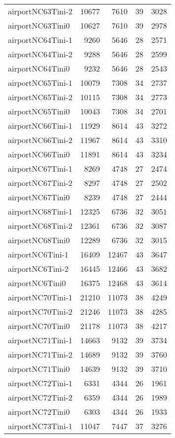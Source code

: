 \begin{longtable}{lrrrr}
airportNC63Tini-2 & 10677 & 7610 & 39 & 3028 \\
airportNC63Tini0 & 10627 & 7610 & 39 & 2978 \\
airportNC64Tini-1 & 9260 & 5646 & 28 & 2571 \\
airportNC64Tini-2 & 9288 & 5646 & 28 & 2599 \\
airportNC64Tini0 & 9232 & 5646 & 28 & 2543 \\
airportNC65Tini-1 & 10079 & 7308 & 34 & 2737 \\
airportNC65Tini-2 & 10115 & 7308 & 34 & 2773 \\
airportNC65Tini0 & 10043 & 7308 & 34 & 2701 \\
airportNC66Tini-1 & 11929 & 8614 & 43 & 3272 \\
airportNC66Tini-2 & 11967 & 8614 & 43 & 3310 \\
airportNC66Tini0 & 11891 & 8614 & 43 & 3234 \\
airportNC67Tini-1 & 8269 & 4748 & 27 & 2474 \\
airportNC67Tini-2 & 8297 & 4748 & 27 & 2502 \\
airportNC67Tini0 & 8239 & 4748 & 27 & 2444 \\
airportNC68Tini-1 & 12325 & 6736 & 32 & 3051 \\
airportNC68Tini-2 & 12361 & 6736 & 32 & 3087 \\
airportNC68Tini0 & 12289 & 6736 & 32 & 3015 \\
airportNC6Tini-1 & 16409 & 12467 & 43 & 3647 \\
airportNC6Tini-2 & 16445 & 12466 & 43 & 3682 \\
airportNC6Tini0 & 16375 & 12468 & 43 & 3614 \\
airportNC70Tini-1 & 21210 & 11073 & 38 & 4249 \\
airportNC70Tini-2 & 21246 & 11073 & 38 & 4285 \\
airportNC70Tini0 & 21178 & 11073 & 38 & 4217 \\
airportNC71Tini-1 & 14663 & 9132 & 39 & 3734 \\
airportNC71Tini-2 & 14689 & 9132 & 39 & 3760 \\
airportNC71Tini0 & 14639 & 9132 & 39 & 3710 \\
airportNC72Tini-1 & 6331 & 4344 & 26 & 1961 \\
airportNC72Tini-2 & 6359 & 4344 & 26 & 1989 \\
airportNC72Tini0 & 6303 & 4344 & 26 & 1933 \\
airportNC73Tini-1 & 11047 & 7447 & 37 & 3276 \\

\end{longtable}
